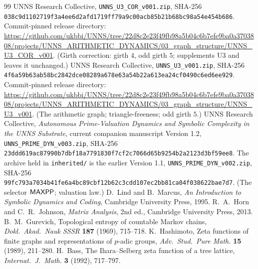 \begin{thebibliography}{99}
 UNNS Research Collective, \texttt{UNNS\_U3\_COR\_v001.zip}, SHA-256 \texttt{038c9d1102719f3a4ee6d2afd1719ff79a9c00acb85b21b68bc98a54e454b686}. Commit-pinned release directory: \url{https://github.com/ukbbi/UNNS/tree/22d8c2e23f49fb98a5b04c6b7efe9ba0a3703808/projects/UNNS_ARITHMETIC_DYNAMICS/03_graph_structure/UNNS_U3_COR_v001}. (Girth correction: girth $4$, odd girth $5$; supplements U3 and leaves it unchanged.)
 UNNS Research Collective, \texttt{UNNS\_U3\_v001.zip}, SHA-256 \texttt{4f6a59b63ab58bc2842dce08289a678e63a54b22a613ea24cf0490c6ed6ee929}. Commit-pinned release directory: \url{https://github.com/ukbbi/UNNS/tree/22d8c2e23f49fb98a5b04c6b7efe9ba0a3703808/projects/UNNS_ARITHMETIC_DYNAMICS/03_graph_structure/UNNS_U3_v001}. (The arithmetic graph; triangle-freeness; odd girth $5$.)
 UNNS Research Collective, \emph{Autonomous Prime-Valuation Dynamics and Symbolic Complexity in the UNNS Substrate}, current companion manuscript Version 1.2, \texttt{UNNS\_PRIME\_DYN\_v003.zip}, SHA-256 \texttt{23ddd619ac87990b7dbf18a7791830f7cf2c7066d65b9254b2a2123d3bf59ee8}. The archive held in \texttt{inherited/} is the earlier Version 1.1, \texttt{UNNS\_PRIME\_DYN\_v002.zip}, SHA-256 \texttt{99fc793a7034b41fe6a4bc89cbf12b62c3cdd107ec2bb81ca04f038622bae7d7}. (The selector $\textsf{MAXPP}$; valuation law.)
 D.~Lind and B.~Marcus, \emph{An Introduction to Symbolic Dynamics and Coding}, Cambridge University Press, 1995.
 R.~A.~Horn and C.~R.~Johnson, \emph{Matrix Analysis}, 2nd ed., Cambridge University Press, 2013.
 B.~M.~Gurevich, Topological entropy of countable Markov chains, \emph{Dokl.\ Akad.\ Nauk SSSR} \textbf{187} (1969), 715--718.
 K.~Hashimoto, Zeta functions of finite graphs and representations of $p$-adic groups, \emph{Adv.\ Stud.\ Pure Math.} \textbf{15} (1989), 211--280.
 H.~Bass, The Ihara--Selberg zeta function of a tree lattice, \emph{Internat.\ J.\ Math.} \textbf{3} (1992), 717--797.
\end{thebibliography}
\endgroup
